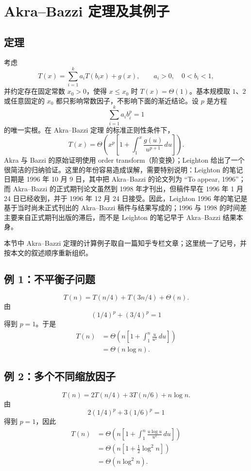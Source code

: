 \documentclass[11pt,a4paper]{article}
\newcommand{\AB}{Akra--Bazzi 定理}
\begin{document}
\section{Akra--Bazzi 定理及其例子}

\subsection{定理}
考虑
\begin{equation}
T(x)=\sum_{i=1}^k a_iT(b_i x)+g(x),
\qquad a_i>0,\quad 0<b_i<1,
\end{equation}
并约定存在固定常数 $x_0>0$，使得 $x\le x_0$ 时 $T(x)=\Theta(1)$。基本规模取 $1$、$2$ 或任意固定的 $x_0$ 都只影响常数因子，不影响下面的渐近结论。设 $p$ 是方程
\begin{equation}
\sum_{i=1}^k a_i b_i^p=1
\end{equation}
的唯一实根。在 \AB{} 的标准正则性条件下，
\begin{equation}
\boxed{
T(x)=\Theta\!\left(x^p\left[1+\int_1^x\frac{g(u)}{u^{p+1}}\,du\right]\right).
}
\end{equation}
Akra 与 Bazzi 的原始证明使用 order transform（阶变换）；Leighton 给出了一个很简洁的归纳验证。这里的年份容易造成误解，需要特别说明：Leighton 的笔记日期是 1996 年 10 月 9 日，其中把 Akra--Bazzi 的论文列为 “To appear, 1996”\cite{Leighton1996}；而 Akra--Bazzi 的正式期刊论文虽然到 1998 年才刊出，但稿件早在 1996 年 1 月 24 日已经收到，并于 1996 年 12 月 24 日接受\cite{AkraBazzi1998}。因此，Leighton 1996 年的笔记是基于当时尚未正式刊出的 Akra--Bazzi 稿件与结果写成的；1996 与 1998 的时间差主要来自正式期刊出版的滞后，而不是 Leighton 的笔记早于 Akra--Bazzi 结果本身。

本节中 Akra--Bazzi 定理的计算例子取自一篇知乎专栏文章\cite{ZhihuABExamples}；这里统一了记号，并按本文的叙述顺序重新组织。

\subsection{例 1：不平衡子问题}
\begin{equation}
T(n)=T(n/4)+T(3n/4)+\Theta(n).
\end{equation}
由
\[
(1/4)^p+(3/4)^p=1
\]
得到 $p=1$。于是
\begin{align}
T(n)
&=\Theta\!\left(n\left[1+\int_1^n\frac{u}{u^2}\,du\right]\right)\\
&=\Theta(n\log n).
\end{align}

\subsection{例 2：多个不同缩放因子}
\begin{equation}
T(n)=2T(n/4)+3T(n/6)+n\log n.
\end{equation}
由
\[
2(1/4)^p+3(1/6)^p=1
\]
得到 $p=1$，因此
\begin{align}
T(n)
&=\Theta\!\left(n\left[1+\int_1^n\frac{u\log u}{u^2}\,du\right]\right)\\
&=\Theta\!\left(n\left[1+\frac12\log^2 n\right]\right)\\
&=\Theta(n\log^2 n).
\end{align}
\end{document}
